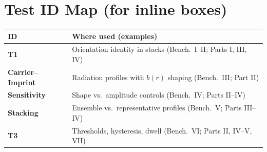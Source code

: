 \documentclass[12pt,a4paper,oneside]{scrreprt}
\begin{document}
\chapter*{Test ID Map (for inline boxes)}
\begin{tabular}{@{}ll@{}}
\toprule
ID & Where used (examples) \\
\midrule
\textbf{T1} & Orientation identity in stacks (Bench.~I–II; Parts I, III, IV) \\
\textbf{Carrier–Imprint} & Radiation profiles with $b(r)$ shaping (Bench.~III; Part II) \\
\textbf{Sensitivity} & Shape vs.\ amplitude controls (Bench.~IV; Parts II–IV) \\
\textbf{Stacking} & Ensemble vs.\ representative profiles (Bench.~V; Parts III–IV) \\
\textbf{T3} & Thresholds, hysteresis, dwell (Bench.~VI; Parts II, IV–V, VII) \\
\bottomrule
\end{tabular}

\appendix
\end{document}
